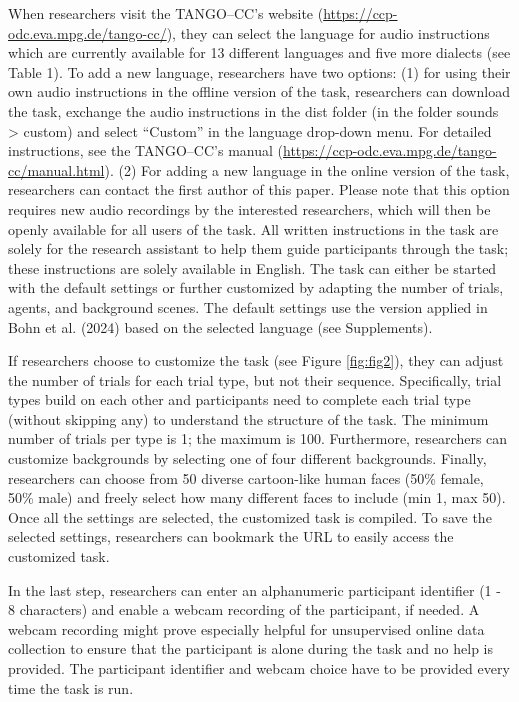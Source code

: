 \documentclass[
  man,floatsintext]{apa7}
\begin{document}
When researchers visit the TANGO--CC's website
(\url{https://ccp-odc.eva.mpg.de/tango-cc/}), they can select the language for audio instructions which are currently available for 13 different languages and five more dialects (see Table 1).
To add a new language, researchers have two options:
(1) for using their own audio instructions in the offline version of the task, researchers can download the task, exchange the audio instructions in the dist folder (in the folder sounds \textgreater{} custom) and select ``Custom'' in the language drop-down menu.
For detailed instructions, see the TANGO--CC's manual (\url{https://ccp-odc.eva.mpg.de/tango-cc/manual.html}).
(2) For adding a new language in the online version of the task, researchers can contact the first author of this paper. Please note that this option requires new audio recordings by the interested researchers, which will then be openly available for all users of the task.
All written instructions in the task are solely for the research assistant to help them guide participants through the task; these instructions are solely available in English.
The task can either be started with the default settings or further customized by adapting the number of trials, agents, and background scenes.
The default settings use the version applied in Bohn et al. (2024) based on the selected language (see Supplements).

If researchers choose to customize the task (see Figure \ref{fig:fig2}), they can adjust the number of trials for each trial type, but not their sequence.
Specifically, trial types build on each other and participants need to complete each trial type (without skipping any) to understand the structure of the task.
The minimum number of trials per type is 1; the maximum is 100.
Furthermore, researchers can customize backgrounds by selecting one of four different backgrounds.
Finally, researchers can choose from 50 diverse cartoon-like human faces (50\% female, 50\% male) and freely select how many different faces to include (min 1, max 50).
Once all the settings are selected, the customized task is compiled.
To save the selected settings, researchers can bookmark the URL to easily access the customized task.

In the last step, researchers can enter an alphanumeric participant identifier (1 - 8 characters) and enable a webcam recording of the participant, if needed.
A webcam recording might prove especially helpful for unsupervised online data collection to ensure that the participant is alone during the task and no help is provided.
The participant identifier and webcam choice have to be provided every time the task is run.
\end{document}
